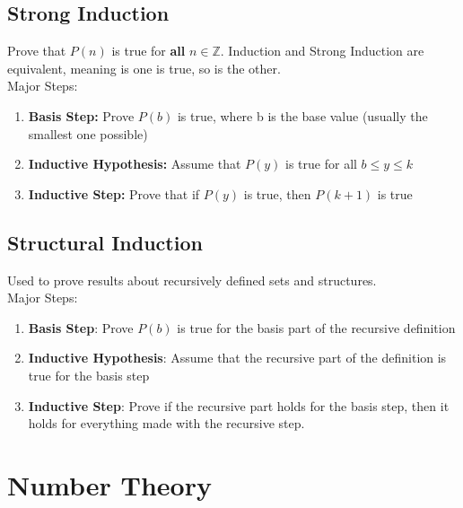 \documentclass[letter]{article}
\begin{document}
\begin{multicols}{2}
  \subsection{Strong Induction}
  Prove that $P(n)$ is true for \textbf{all} $n \in \mathbb{Z}$. Induction and
  Strong Induction are equivalent, meaning is one is true, so is the other. \\
  Major Steps:
  \begin{enumerate}
    \item \textbf{Basis Step:} Prove $P(b)$ is true, where b is the base value
          (usually the smallest one possible)
    \item \textbf{Inductive Hypothesis:} Assume that $P(y)$ is true for all
          $b \leq y \leq k$
    \item \textbf{Inductive Step:} Prove that if $P(y)$ is true, then $P(k + 1)$
          is true
  \end{enumerate}

  \subsection{Structural Induction}
  Used to prove results about recursively defined sets and structures. \\
  Major Steps:
  \begin{enumerate}
    \item \textbf{Basis Step}: Prove $P(b)$ is true for the basis part of the
          recursive definition
    \item \textbf{Inductive Hypothesis}: Assume that the recursive part of the
          definition is true for the basis step
    \item \textbf{Inductive Step}: Prove if the recursive part holds for the
          basis step, then it holds for everything made with the recursive step.
  \end{enumerate}

  \section{Number Theory}


\end{multicols}
\end{document}
